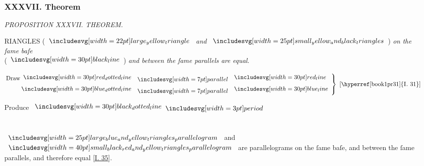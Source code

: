 \documentclass[12pt,preview]{standalone}
\begin{document}
\subsubsection{XXXVII. Theorem}

\begin{minipage}[t]{0.33\textwidth}
    \vspace{44pt}
    
\end{minipage}%
\hfill
\begin{minipage}[t]{0.64\textwidth}
    \vspace{0pt}

    \begin{center}
        \textit{PROPOSITION XXXVII. THEOREM.}\label{book1pr37} \\
    \end{center}

    \hfill

    \begin{center}
        \raggedright \lettrine[lines=4, loversize=1, nindent=0pt]{}{}RIANGLES (\hspace{-1ex}$\img[0][0][22]{large_yellow_triangle}$ \textit{and} $\img{small_yellow_and_black_triangles}$\hspace{-1ex}) \textit{on the ſame baſe}\\ (\hspace{-1ex}$\blackline$\hspace{-1ex}) \textit{and between the ſame parallels are equal}.
    \end{center}

    \hfill

    \hfill

    \hfill

    {\vspace{1ex}\begin{center}
            $\left.\begin{aligned}\text{Draw}\dottedredline & \bparallel \redline \\ \dottedblueline & \bparallel \blueline \end{aligned}\right\}\text{ [\hyperref[book1pr31]{\textsc{I.} 31}]}$
        \end{center}}

    \hfill

    \hfill

    \begin{center}
        Produce $\dottedblackline \bperiod$\\
        \hfill\\
        \hfill\\
        $\img{large_blue_and_yellow_triangles_parallelogram}$ and $\img[0][0][40]{small_black_red_and_yellow_triangles_parallelogram}$ are parallelograms on the ſame baſe, and between the ſame parallels, and therefore equal [\hyperref[book1pr35]{\textsc{I.} 35}].
    \end{center}


\end{minipage}
\end{document}
